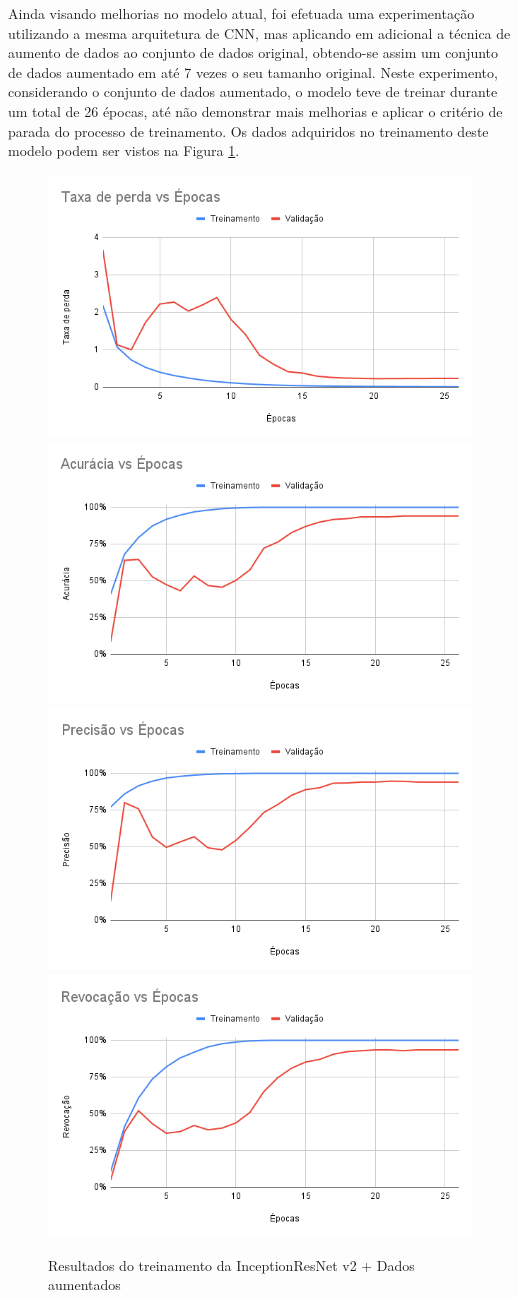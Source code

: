 \documentclass[
	12pt,				%
	oneside,			%
	a4paper,			%
	english,			%
	brazil				%
	]{abntex2ppgsi}
\begin{document}
Ainda visando melhorias no modelo atual, foi efetuada uma experimentação utilizando a mesma arquitetura de CNN, mas aplicando em adicional a técnica de aumento de dados ao conjunto de dados original, obtendo-se assim um conjunto de dados aumentado em até 7 vezes o seu tamanho original. Neste experimento, considerando o conjunto de dados aumentado, o modelo teve de treinar durante um total de 26 épocas, até não demonstrar mais melhorias e aplicar o critério de parada do processo de treinamento. Os dados adquiridos no treinamento deste modelo podem ser vistos na Figura \ref{fig:inception_resnet_v2_dados_aumentados}.

\begin{figure}[H]
    \centering
    \caption{Resultados do treinamento da InceptionResNet v2 + Dados aumentados}
    \includegraphics[width=.50\textwidth]{imagens/resultados_discussao/architecture/inception_resnet_v2/augmented/perda.png}\hfill
    \includegraphics[width=.50\textwidth]{imagens/resultados_discussao/architecture/inception_resnet_v2/augmented/acuracia.png}\bigbreak    \includegraphics[width=.50\textwidth]{imagens/resultados_discussao/architecture/inception_resnet_v2/augmented/precisao.png}\hfill
    \includegraphics[width=.50\textwidth]{imagens/resultados_discussao/architecture/inception_resnet_v2/augmented/revocacao.png}
    \label{fig:inception_resnet_v2_dados_aumentados}
\end{figure}
\end{document}
